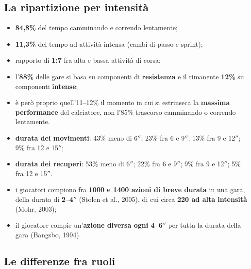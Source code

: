 \subsection{La ripartizione per intensità}

\begin{itemize}
  \item \textbf{84,8\%} del tempo camminando e correndo lentamente;
  \item \textbf{11,3\%} del tempo ad attività intensa (cambi di passo e sprint);
  \item rapporto di \textbf{1:7} fra alta e bassa attività di corsa;
  \item l'\textbf{88\%} delle gare si basa su componenti di \textbf{resistenza} e il rimanente
    \textbf{12\%} su componenti \textbf{intense};
  \item è però proprio quell'11--12\% il momento in cui si estrinseca la \textbf{massima
    performance} del calciatore, non l'85\% trascorso camminando o correndo lentamente.
\end{itemize}

\begin{itemize}
  \item \textbf{durata dei movimenti}: 43\% meno di 6$''$; 23\% fra 6 e 9$''$; 13\% fra 9 e
    12$''$; 9\% fra 12 e 15$''$;
  \item \textbf{durata dei recuperi}: 53\% meno di 6$''$; 22\% fra 6 e 9$''$; 9\% fra 9 e 12$''$;
    5\% fra 12 e 15$''$.
\end{itemize}

\begin{itemize}
  \item i giocatori compiono fra \textbf{1000 e 1400 azioni di breve durata} in una gara, della
    durata di \textbf{2--4$''$} (Stolen et al., 2005), di cui circa \textbf{220 ad alta intensità}
    (Mohr, 2003);
  \item il giocatore compie un'\textbf{azione diversa ogni 4--6$''$} per tutta la durata della gara
    (Bangsbo, 1994).
\end{itemize}

\subsection{Le differenze fra ruoli}

